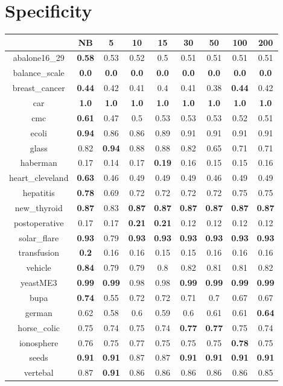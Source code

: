 \documentclass{article}%
\begin{document}
%
\section*{Specificity}%
\begin{tabular}{c|cccccccc}%
\hline%
&NB&5&10&15&30&50&100&200\\%
\hline%
abalone16\_29&\textbf{0.58}&0.53&0.52&0.5&0.51&0.51&0.51&0.51\\%
\hline%
balance\_scale&\textbf{0.0}&\textbf{0.0}&\textbf{0.0}&\textbf{0.0}&\textbf{0.0}&\textbf{0.0}&\textbf{0.0}&\textbf{0.0}\\%
\hline%
breast\_cancer&\textbf{0.44}&0.42&0.41&0.4&0.41&0.38&\textbf{0.44}&0.42\\%
\hline%
car&\textbf{1.0}&\textbf{1.0}&\textbf{1.0}&\textbf{1.0}&\textbf{1.0}&\textbf{1.0}&\textbf{1.0}&\textbf{1.0}\\%
\hline%
cmc&\textbf{0.61}&0.47&0.5&0.53&0.53&0.53&0.52&0.51\\%
\hline%
ecoli&\textbf{0.94}&0.86&0.86&0.89&0.91&0.91&0.91&0.91\\%
\hline%
glass&0.82&\textbf{0.94}&0.88&0.88&0.82&0.65&0.71&0.71\\%
\hline%
haberman&0.17&0.14&0.17&\textbf{0.19}&0.16&0.15&0.15&0.16\\%
\hline%
heart\_cleveland&\textbf{0.63}&0.46&0.49&0.49&0.49&0.46&0.49&0.49\\%
\hline%
hepatitis&\textbf{0.78}&0.69&0.72&0.72&0.72&0.72&0.75&0.75\\%
\hline%
new\_thyroid&\textbf{0.87}&0.83&\textbf{0.87}&\textbf{0.87}&\textbf{0.87}&\textbf{0.87}&\textbf{0.87}&\textbf{0.87}\\%
\hline%
postoperative&0.17&0.17&\textbf{0.21}&\textbf{0.21}&0.12&0.12&0.12&0.12\\%
\hline%
solar\_flare&\textbf{0.93}&0.79&\textbf{0.93}&\textbf{0.93}&\textbf{0.93}&\textbf{0.93}&\textbf{0.93}&\textbf{0.93}\\%
\hline%
transfusion&\textbf{0.2}&0.16&0.16&0.15&0.15&0.16&0.16&0.16\\%
\hline%
vehicle&\textbf{0.84}&0.79&0.79&0.8&0.82&0.81&0.81&0.82\\%
\hline%
yeastME3&\textbf{0.99}&\textbf{0.99}&0.98&0.98&\textbf{0.99}&\textbf{0.99}&\textbf{0.99}&\textbf{0.99}\\%
\hline%
bupa&\textbf{0.74}&0.55&0.72&0.72&0.71&0.7&0.67&0.67\\%
\hline%
german&0.62&0.58&0.6&0.59&0.6&0.61&0.61&\textbf{0.64}\\%
\hline%
horse\_colic&0.75&0.74&0.75&0.74&\textbf{0.77}&\textbf{0.77}&0.75&0.74\\%
\hline%
ionosphere&0.76&0.75&0.77&0.75&0.75&0.75&\textbf{0.78}&0.75\\%
\hline%
seeds&\textbf{0.91}&\textbf{0.91}&0.87&0.87&\textbf{0.91}&\textbf{0.91}&\textbf{0.91}&\textbf{0.91}\\%
\hline%
vertebal&0.87&\textbf{0.91}&0.86&0.86&0.86&0.86&0.86&0.85\\%
\hline%
\end{tabular}
\end{document}

